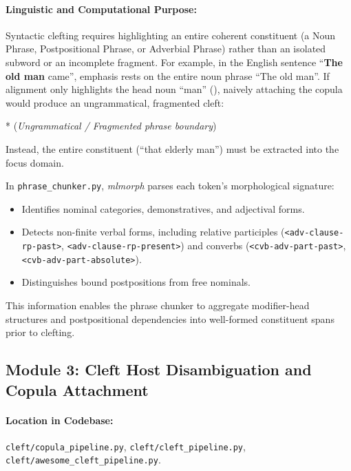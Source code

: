\paragraph{Linguistic and Computational Purpose:}
Syntactic clefting requires highlighting an entire coherent constituent (a Noun Phrase, Postpositional Phrase, or Adverbial Phrase) rather than an isolated subword or an incomplete fragment. For example, in the English sentence ``\textbf{The old man} came'', emphasis rests on the entire noun phrase ``The old man''. If alignment only highlights the head noun ``man'' (), naively attaching the copula would produce an ungrammatical, fragmented cleft:
\begin{center}
* \quad (\textit{Ungrammatical / Fragmented phrase boundary})
\end{center}
Instead, the entire constituent  (``that elderly man'') must be extracted into the focus domain.

In \texttt{phrase\_chunker.py}, \textit{mlmorph} parses each token's morphological signature:
\begin{itemize}[noitemsep]
    \item Identifies nominal categories, demonstratives, and adjectival forms.
    \item Detects non-finite verbal forms, including relative participles (\texttt{<adv-clause-rp-past>}, \texttt{<adv-clause-rp-present>}) and converbs (\texttt{<cvb-adv-part-past>}, \texttt{<cvb-adv-part-absolute>}).
    \item Distinguishes bound postpositions from free nominals.
\end{itemize}
This information enables the phrase chunker to aggregate modifier-head structures and postpositional dependencies into well-formed constituent spans prior to clefting.

\subsection{Module 3: Cleft Host Disambiguation and Copula Attachment}
\label{subsec:mod3_copula}

\paragraph{Location in Codebase:} \texttt{cleft/copula\_pipeline.py}, \texttt{cleft/cleft\_pipeline.py}, \texttt{cleft/awesome\_cleft\_pipeline.py}.
